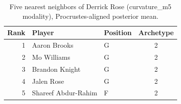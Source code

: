 \begin{table}[htbp]
  \centering\small
  \begin{tabular}{rllc}
    \toprule
    Rank & Player & Position & Archetype \\
    \midrule
    1 & Aaron Brooks & G & 2 \\
    2 & Mo Williams & G & 2 \\
    3 & Brandon Knight & G & 2 \\
    4 & Jalen Rose & G & 2 \\
    5 & Shareef Abdur-Rahim & F & 2 \\
    \bottomrule
  \end{tabular}
  \caption{Five nearest neighbors of Derrick Rose (curvature_m5 modality), Procrustes-aligned posterior mean.}
  \label{tab:Derrick_Rose_neighbors_curvature_m5}
\end{table}

